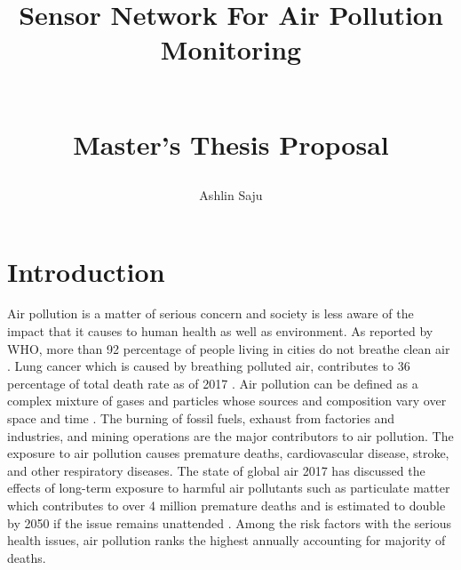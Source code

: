 \documentclass[11pt]{article}
\title{\begin{Large}
\textbf{Sensor Network For Air Pollution Monitoring}
\end{Large}\\ Master's Thesis Proposal}
\author{Ashlin Saju}
\date{}
\begin{document}
\maketitle
\newpage
\tableofcontents
\newpage

\section{Introduction}

Air pollution is a matter of serious concern and society is less aware of the impact that it causes to human health as well as environment. As reported by WHO, more than 92 percentage of people living in cities do not breathe clean air \cite{who}. Lung cancer which is caused by breathing polluted air, contributes to 36 percentage of total death rate as of 2017 \cite{who}.
Air pollution can be defined as a complex mixture of gases and particles whose sources and composition vary over space and time \cite{HealthEffectsInstitute2017}. The burning of fossil fuels, exhaust from factories and industries, and mining operations are the major contributors to air pollution. The exposure to air pollution causes premature deaths, cardiovascular disease, stroke, and other respiratory diseases. The state of global air 2017 has discussed the effects of long-term exposure to harmful air pollutants such as particulate matter which contributes to over 4 million premature deaths and is estimated to double by 2050 if the issue remains unattended \cite{HealthEffectsInstitute2017}. Among the risk factors with the serious health issues, air pollution ranks the highest annually accounting for majority of deaths.
\end{document}
